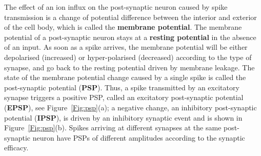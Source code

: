 The effect of an ion influx on the post-synaptic neuron caused by spike transmission is a change of potential difference between the interior and exterior of the cell body, which is called the \textbf{membrane potential}.
The membrane potential of a post-synaptic neuron stays at a \textbf{resting potential} in the absence of an input.
As soon as a spike arrives, the membrane potential will be either depolarised (increased) or hyper-polarised (decreased) according to the type of synapse, and go back to the resting potential driven by membrane leakage.
The state of the membrane potential change caused by a single spike is called the post-synaptic potential (\textbf{PSP}). 
Thus, a spike transmitted by an excitatory synapse triggers a positive PSP, called an excitatory post-synaptic potential (\textbf{EPSP}), see Figure~\ref{Fig:psp}(a);
a negative change, an inhibitory post-synaptic potential (\textbf{IPSP}), is driven by an inhibitory synaptic event and is shown in Figure~\ref{Fig:psp}(b).
Spikes arriving at different synapses at the same post-synaptic neuron have PSPs of different amplitudes according to the synaptic efficacy.





